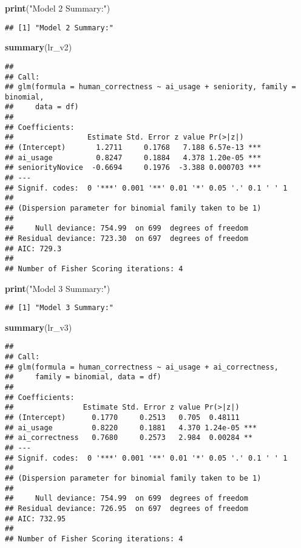 \documentclass[
]{article}
\newenvironment{Shaded}{\begin{snugshade}}{\end{snugshade}}
\newcommand{\FunctionTok}[1]{\textcolor[rgb]{0.13,0.29,0.53}{\textbf{#1}}}
\newcommand{\NormalTok}[1]{#1}
\newcommand{\StringTok}[1]{\textcolor[rgb]{0.31,0.60,0.02}{#1}}
\begin{document}
\begin{Shaded}
\begin{Highlighting}[]
\FunctionTok{print}\NormalTok{(}\StringTok{"Model 2 Summary:"}\NormalTok{)}
\end{Highlighting}
\end{Shaded}

\begin{verbatim}
## [1] "Model 2 Summary:"
\end{verbatim}

\begin{Shaded}
\begin{Highlighting}[]
\FunctionTok{summary}\NormalTok{(lr\_v2)}
\end{Highlighting}
\end{Shaded}

\begin{verbatim}
## 
## Call:
## glm(formula = human_correctness ~ ai_usage + seniority, family = binomial, 
##     data = df)
## 
## Coefficients:
##                 Estimate Std. Error z value Pr(>|z|)    
## (Intercept)       1.2711     0.1768   7.188 6.57e-13 ***
## ai_usage          0.8247     0.1884   4.378 1.20e-05 ***
## seniorityNovice  -0.6694     0.1976  -3.388 0.000703 ***
## ---
## Signif. codes:  0 '***' 0.001 '**' 0.01 '*' 0.05 '.' 0.1 ' ' 1
## 
## (Dispersion parameter for binomial family taken to be 1)
## 
##     Null deviance: 754.99  on 699  degrees of freedom
## Residual deviance: 723.30  on 697  degrees of freedom
## AIC: 729.3
## 
## Number of Fisher Scoring iterations: 4
\end{verbatim}

\begin{Shaded}
\begin{Highlighting}[]
\FunctionTok{print}\NormalTok{(}\StringTok{"Model 3 Summary:"}\NormalTok{)}
\end{Highlighting}
\end{Shaded}

\begin{verbatim}
## [1] "Model 3 Summary:"
\end{verbatim}

\begin{Shaded}
\begin{Highlighting}[]
\FunctionTok{summary}\NormalTok{(lr\_v3)}
\end{Highlighting}
\end{Shaded}

\begin{verbatim}
## 
## Call:
## glm(formula = human_correctness ~ ai_usage + ai_correctness, 
##     family = binomial, data = df)
## 
## Coefficients:
##                Estimate Std. Error z value Pr(>|z|)    
## (Intercept)      0.1770     0.2513   0.705  0.48111    
## ai_usage         0.8220     0.1881   4.370 1.24e-05 ***
## ai_correctness   0.7680     0.2573   2.984  0.00284 ** 
## ---
## Signif. codes:  0 '***' 0.001 '**' 0.01 '*' 0.05 '.' 0.1 ' ' 1
## 
## (Dispersion parameter for binomial family taken to be 1)
## 
##     Null deviance: 754.99  on 699  degrees of freedom
## Residual deviance: 726.95  on 697  degrees of freedom
## AIC: 732.95
## 
## Number of Fisher Scoring iterations: 4
\end{verbatim}
\end{document}
